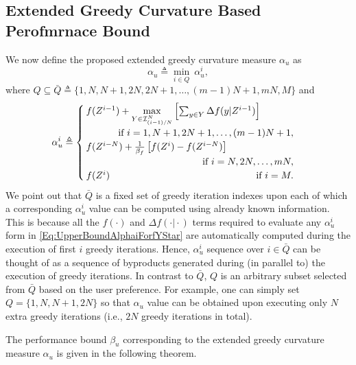 \documentclass[conference]{IEEEtran}
\begin{document}
\subsection{Extended Greedy Curvature Based Perofmrnace Bound}

We now define the proposed extended greedy curvature measure $\alpha_u$ as 
\begin{equation}\label{Eq:ExtGreedyCurvatureMeasure}
    \alpha_u \triangleq \min_{i \in Q}\ \alpha^i_u,
\end{equation}
where $Q \subseteq \bar{Q} \triangleq \{1,N,N+1,2N,2N+1,\ldots,(m-1)N+1,mN,M\}$ and
\begin{equation}\label{Eq:UpperBoundAlphaiForfYStar}
    \alpha^i_u \triangleq 
    \begin{cases}
     f(Z^{i-1}) + \underset{Y\in\mathcal{I}^N_{(i-1)/N}}{\max} \left[ \sum_{y\in Y} \Delta f(y \vert Z^{i-1})\right]\\
     \ \ \ \ \ \ \ \ \ \ \mbox{if }i=1,N+1,2N+1,\ldots, (m-1)N+1,\\
     f(Z^{i-N}) + \frac{1}{\beta_f}\left[ f(Z^i) - f(Z^{i-N}) \right]\\
     \hfill \mbox{if }i=N,2N,\ldots, mN,\\
     f(Z^i) \hfill \mbox{if }i=M. 
    \end{cases}
\end{equation}
We point out that $\bar{Q}$ is a fixed set of greedy iteration indexes upon each of which a corresponding $\alpha^i_u$ value can be computed using already known information. This is because all the $f(\cdot)$ and $\Delta f(\cdot \vert \cdot)$ terms required to evaluate any $\alpha^i_u$ form in \eqref{Eq:UpperBoundAlphaiForfYStar} are automatically computed during the execution of first $i$ greedy iterations. Hence, $\alpha^i_u$ sequence over $i\in \bar{Q}$ can be thought of as a sequence of byproducts generated during (in parallel to) the execution of greedy iterations. In contrast to $\bar{Q}$, $Q$ is an arbitrary subset selected from $\bar{Q}$ based on the user preference. For example, one can simply set $Q=\{1,N,N+1,2N\}$ so that $\alpha_u$ value can be obtained upon executing only $N$ extra greedy iterations (i.e., $2N$ greedy iterations in total).   

The performance bound $\beta_u$ corresponding to the extended greedy curvature measure $\alpha_u$ is given in the following theorem.
\end{document}
